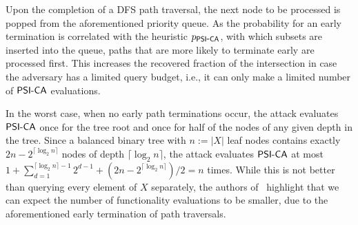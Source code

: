 Upon the completion of a DFS path traversal, the next node to be processed is popped from the aforementioned priority queue.
As the probability for an early termination is correlated with the heuristic $p_{\mathsf{PSI\mbox{-}CA}}$, 
with which subsets are inserted into the queue, 
paths that are more likely to terminate early are processed first.
This increases the recovered fraction of the intersection
in case the adversary has a limited query budget, i.e., it can only make a limited number of $\mathsf{PSI\mbox{-}CA}{}$ evaluations.

In the worst case, when no early path terminations occur, 
the attack evaluates $\mathsf{PSI\mbox{-}CA}{}$ once for the tree root and once for half of the nodes of any given depth in the tree.
Since a balanced binary tree with $n := |X|$ leaf nodes contains
exactly $2n - 2^{\lceil \log_2 n\rceil}$ nodes of depth $\lceil \log_2 n \rceil$,
the attack evaluates $\mathsf{PSI\mbox{-}CA}{}$ at most $1 + \sum_{d=1}^{\lceil \log_2 n\rceil - 1} 2^{d-1} + (2n - 2^{\lceil \log_2 n\rceil}) / 2 = n$ times.
While this is not better than querying every element of $X$ separately,
the authors of~\cite{USENIX:GHLWJL22} highlight that we can expect the number of functionality evaluations to be smaller, 
due to the aforementioned early termination of path traversals. 
